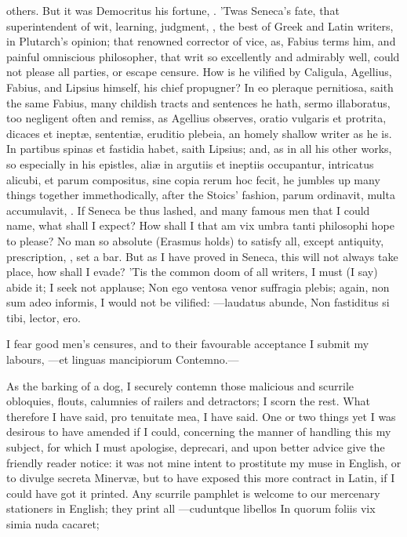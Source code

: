{others. But it was Democritus his fortune, . 'Twas Seneca's fate, that superintendent of
wit, learning, judgment, , the best of Greek and
Latin writers, in Plutarch's opinion; that renowned corrector of vice,
as, Fabius terms him, and painful omniscious philosopher, that
writ so excellently and admirably well, could not please all parties,
or escape censure. How is he vilified by  Caligula, Agellius,
Fabius, and Lipsius himself, his chief propugner? In eo pleraque
pernitiosa, saith the same Fabius, many childish tracts and sentences
he hath, sermo illaboratus, too negligent often and remiss, as Agellius
observes, oratio vulgaris et protrita, dicaces et inept\ae{}, sententi\ae{},
eruditio plebeia, an homely shallow writer as he is. In partibus spinas
et fastidia habet, saith Lipsius; and, as in all his other works,
so especially in his epistles, ali\ae{} in argutiis et ineptiis
occupantur, intricatus alicubi, et parum compositus, sine copia rerum
hoc fecit, he jumbles up many things together immethodically, after the
Stoics' fashion, parum ordinavit, multa accumulavit, \etc. If Seneca be
thus lashed, and many famous men that I could name, what shall I
expect? How shall I that am vix umbra tanti philosophi hope to please?
No man so absolute (Erasmus holds) to satisfy all, except
antiquity, prescription, \etc, set a bar. But as I have proved in
Seneca, this will not always take place, how shall I evade? 'Tis the
common doom of all writers, I must (I say) abide it; I seek not
applause; Non ego ventosa venor suffragia plebis; again, non sum
adeo informis, I would not be vilified:
---laudatus abunde,
Non fastiditus si tibi, lector, ero.

I fear good men's censures, and to their favourable acceptance I submit
my labours,
---et linguas mancipiorum
Contemno.---

As the barking of a dog, I securely contemn those malicious and
scurrile obloquies, flouts, calumnies of railers and detractors; I
scorn the rest. What therefore I have said, pro tenuitate mea, I have
said.
One or two things yet I was desirous to have amended if I could,
concerning the manner of handling this my subject, for which I must
apologise, deprecari, and upon better advice give the friendly reader
notice: it was not mine intent to prostitute my muse in English, or to
divulge secreta Minerv\ae{}, but to have exposed this more contract in
Latin, if I could have got it printed. Any scurrile pamphlet is welcome
to our mercenary stationers in English; they print all
---cuduntque libellos
In quorum foliis vix simia nuda cacaret;

}
